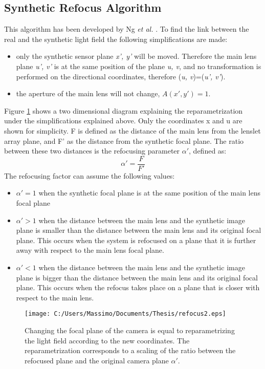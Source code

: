  \subsection{Synthetic Refocus Algorithm}
 This algorithm has been developed by Ng \textit{et al.} \cite{ng2005light}. To find the link between the real and the synthetic light field the following simplifications are made: 
 \begin{itemize}
 	\item only the synthetic sensor plane \textit{x', y'} will be moved. Therefore the main lens plane \textit{u', v'} is at the same position of the plane \textit{u, v}, and no transformation is performed on the directional coordinates, therefore (\textit{u, v})=(\textit{u', v'}).
 	\item the aperture of the main lens will not change, $A(x', y')=1$.
 \end{itemize} 
 Figure \ref{fig:synthetic3} shows a two dimensional diagram explaining the reparametrization under the simplifications explained above. Only the coordinates x and u are shown for simplicity. F is defined as the distance of the main lens from the lenslet array plane, and F' as the distance from the synthetic focal plane. The ratio between these two distances is the refocusing parameter $ \alpha'$, defined as: 
 \begin{equation}
 	\label{eq:alpha}
 	 \alpha' = \dfrac{F}{F'}
 \end{equation}
 The refocusing factor can assume the following values:
 \begin{itemize}
 	\item $ \alpha'=1$ when the synthetic focal plane is at the same position of the main lens focal plane
 	\item $ \alpha'>1$ when the distance between the main lens and the synthetic 
 	image plane is smaller than the distance between the main lens and its original focal plane. This occurs when the system is refocused on a plane that it is further away with respect to the main lens focal plane.
 	\item $ \alpha'<1$ when the distance between the main lens and the synthetic image plane is bigger than the distance between the main lens and its original focal plane. This occurs when the refocus takes place on a plane that is closer with respect to the main lens.
 \end{itemize}
 \begin{figure}[H]
 	\centering
 	\texttt{[image: C:/Users/Massimo/Documents/Thesis/refocus2.eps]}
 	\caption{\label{fig:synthetic3} Changing the focal plane of the camera is equal to reparametrizing the light field according to the new coordinates. The reparametrization corresponds to a scaling of the ratio between the refocused plane and the original camera plane $ \alpha'$. }
 \end{figure}
